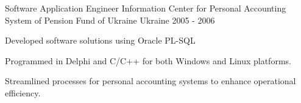 \begin{cventries}
\cventry
  {Software Application Engineer} %
  {Information Center for Personal Accounting System of Pension Fund of Ukraine} %
  {Ukraine} %
  {2005 - 2006} %
  {
    \begin{cvitems} %
      \item {Developed software solutions using Oracle PL-SQL}
      \item {Programmed in Delphi and C/C++ for both Windows and Linux platforms.}
      \item {Streamlined processes for personal accounting systems to enhance operational efficiency.}
    \end{cvitems}
  } 

\end{cventries}
